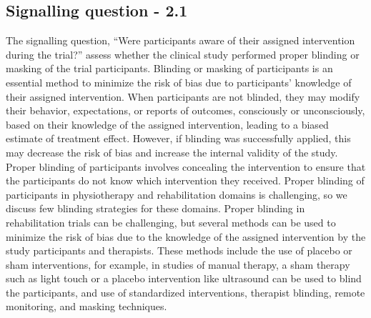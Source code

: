 \documentclass[sn-mathphys,Numbered]{sn-jnl}%
\begin{document}
\subsection*{Signalling question - 2.1}
\label{subsec:2_1}
%
The signalling question, ``Were participants aware of their assigned intervention during the trial?'' assess whether the clinical study performed proper blinding or masking of the trial participants.
Blinding or masking of participants is an essential method to minimize the risk of bias due to participants' knowledge of their assigned intervention.
When participants are not blinded, they may modify their behavior, expectations, or reports of outcomes, consciously or unconsciously, based on their knowledge of the assigned intervention, leading to a biased estimate of treatment effect.
However, if blinding was successfully applied, this may decrease the risk of bias and increase the internal validity of the study.
Proper blinding of participants involves concealing the intervention to ensure that the participants do not know which intervention they received.
Proper blinding of participants in physiotherapy and rehabilitation domains is challenging, so we discuss few blinding strategies for these domains. 
Proper blinding in rehabilitation trials can be challenging, but several methods can be used to minimize the risk of bias due to the knowledge of the assigned intervention by the study participants and therapists. These methods include the use of placebo or sham interventions, for example, in studies of manual therapy, a sham therapy such as light touch or a placebo intervention like ultrasound can be used to blind the participants, and use of standardized interventions, therapist blinding, remote monitoring, and masking techniques.
\end{document}

